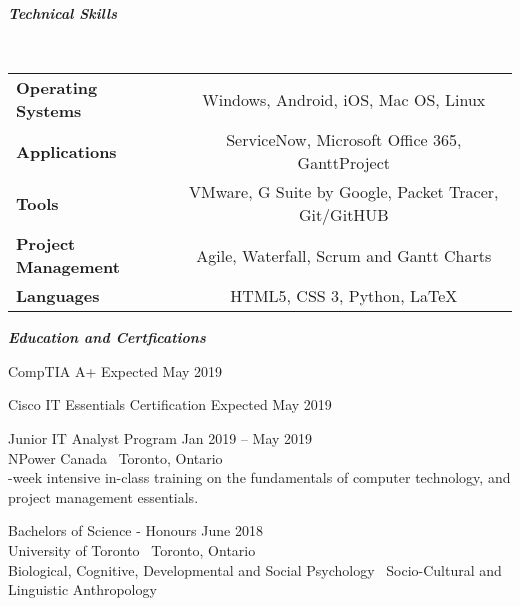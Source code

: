 \documentclass{article}
\begin{document}
\begin{center}
 \large \textcolor{ablue}{\textit{\textbf{Technical Skills}}}
\end{center}

~\begin{tabular}{l c}
 
\textbf{Operating Systems} & Windows, Android, iOS, Mac OS, Linux  \\
\textbf{Applications} & ServiceNow, Microsoft Office 365, GanttProject  \\
\textbf{Tools} & VMware, G Suite by Google, Packet Tracer, Git/GitHUB \\
\textbf{Project Management} & Agile, Waterfall, Scrum and Gantt Charts \\
\textbf{Languages} & HTML5, CSS 3, Python, \LaTeX \\

\end{tabular}


\begin{center}
 \large  \textcolor{ablue}{\textit{\textbf{Education and Certfications}}}
\end{center}

\begin{doublespacing}

\noindent CompTIA A+    
\hfill Expected May 2019

\noindent Cisco IT Essentials Certification
\hfill Expected May 2019 

\begin{singlespacing}

\noindent Junior IT Analyst Program 
\hfill Jan 2019 – May 2019 
\\\noindent NPower Canada \textbar \ {Toronto, Ontario }
\\-week intensive in-class training on the fundamentals of computer technology, and project management essentials.

\end{singlespacing}

\begin{singlespacing}

\noindent Bachelors of Science - Honours 
\hfill June 2018 
\\\noindent University of Toronto \textbar \ Toronto, Ontario
\\\noindent Biological, Cognitive, Developmental and Social Psychology \textbar  \ Socio-Cultural and Linguistic Anthropology 

\end{singlespacing}

\end{doublespacing}
\end{document}
